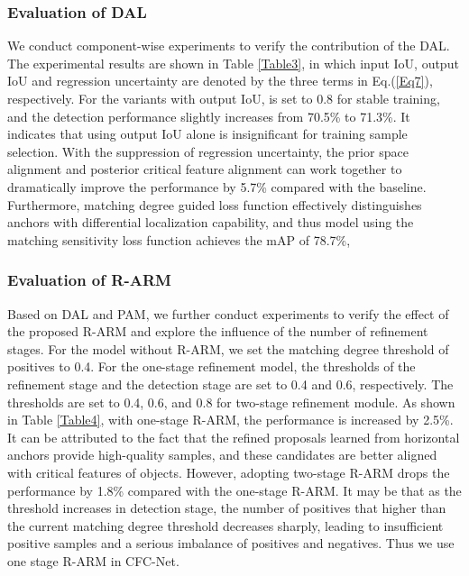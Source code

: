 \documentclass[journal]{IEEEtran}
\begin{document}
\subsubsection{Evaluation of DAL}
We conduct component-wise experiments to verify the contribution of the DAL. The experimental results are shown in Table \ref{Table3}, in which input IoU, output IoU and regression uncertainty are denoted by the three terms in Eq.(\ref{Eq7}), respectively. For the variants with output IoU,   is set to 0.8 for stable training, and the detection performance slightly increases from 70.5\% to 71.3\%. It indicates that using output IoU alone is insignificant for training sample selection. With the suppression of regression uncertainty, the prior space alignment and posterior critical feature alignment can work together to dramatically improve the performance by 5.7\% compared with the baseline. Furthermore, matching degree guided loss function effectively distinguishes anchors with differential localization capability, and thus model using the matching sensitivity loss function achieves the mAP of 78.7\%,





\subsubsection{Evaluation of R-ARM}
Based on DAL and PAM, we further conduct experiments to verify the effect of the proposed R-ARM and explore the influence of the number of refinement stages. For the model without R-ARM, we set the matching degree threshold of positives to 0.4. For the one-stage refinement model, the thresholds of the refinement stage and the detection stage are set to 0.4 and 0.6, respectively.  The thresholds are set to 0.4, 0.6, and 0.8 for two-stage refinement module. As shown in Table \ref{Table4}, with one-stage R-ARM, the performance is increased by 2.5\%. It can be attributed to the fact that the refined proposals learned from horizontal anchors provide high-quality samples, and these candidates are better aligned with critical features of objects. However, adopting two-stage R-ARM drops the performance by 1.8\% compared with the one-stage R-ARM. It may be that as the threshold increases in detection stage, the number of positives that higher than the current matching degree threshold decreases sharply, leading to insufficient positive samples and a serious imbalance of positives and negatives. Thus we use one stage R-ARM in CFC-Net.
\end{document}
